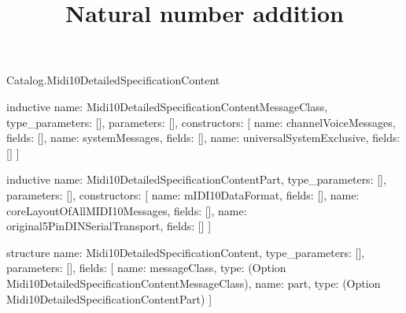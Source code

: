 \begin{lexlean}{Catalog.Midi10DetailedSpecificationContent}
\title{Natural number addition}
\begin{semanticmodule}
inductive{
  name: Midi10DetailedSpecificationContentMessageClass,
  type_parameters: [],
  parameters: [],
  constructors: [
    {name: channelVoiceMessages, fields: []},
    {name: systemMessages, fields: []},
    {name: universalSystemExclusive, fields: []}
  ]
}

inductive{
  name: Midi10DetailedSpecificationContentPart,
  type_parameters: [],
  parameters: [],
  constructors: [
    {name: mIDI10DataFormat, fields: []},
    {name: coreLayoutOfAllMIDI10Messages, fields: []},
    {name: original5PinDINSerialTransport, fields: []}
  ]
}

structure{
  name: Midi10DetailedSpecificationContent,
  type_parameters: [],
  parameters: [],
  fields: [
    {name: messageClass, type: (Option Midi10DetailedSpecificationContentMessageClass)},
    {name: part, type: (Option Midi10DetailedSpecificationContentPart)}
  ]
}
\end{semanticmodule}
\end{lexlean}

